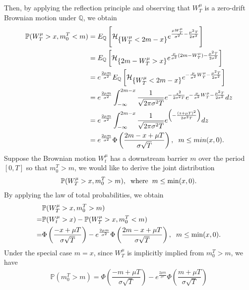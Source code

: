 Then, by applying the reflection principle and observing
that $W^\mu_T$ is a zero-drift Brownian motion under 
$\mathbb{Q}$, we obtain
\begin{align*}
	\mathbb{P}(W^\mu_T>x, m^T_0<m)&=E_\mathbb{Q}\left[\mathcal{H}_{\displaystyle \{W^\mu_T<2m-x\}}e^{\frac{\mu W^\mu_T }{\sigma^2}-\frac{\mu^2 T}{2\sigma^2}}\right]\\
	&=E_\mathbb{Q}\left[\mathcal{H}_{\displaystyle \{2m-W^\mu_T>x\}}e^{\frac{\mu }{\sigma^2}(2m-W^\mu_T)-\frac{\mu^2 T}{2\sigma^2}}\right]\\
	&=e^{\frac{2\mu m}{\sigma^2}}E_\mathbb{Q}\left[\mathcal{H}_{\displaystyle \{W^\mu_T<2m-x\}}e^{-\frac{\mu }{\sigma^2}W^\mu_T-\frac{\mu^2 T}{2\sigma^2}}\right]\\
	&=e^{\frac{2\mu m}{\sigma^2}}\displaystyle \int_{-\infty}^{2m-x}\dfrac{1}{\sqrt{2\pi\sigma^2 T}}e^{-\frac{z^2}{2\sigma^2 T}}e^{-\frac{\mu }{\sigma^2}W^\mu_T-\frac{\mu^2 T}{2\sigma^2}}dz\\
	&=e^{\frac{2\mu m}{\sigma^2}}\displaystyle \int_{-\infty}^{2m-x}\dfrac{1}{\sqrt{2\pi\sigma^2 T}}e^{\left(-\frac{(z+\mu T)^2}{2\sigma^2 T}\right)}dz\\
	&=e^{\frac{2\mu m}{\sigma^2}}\Phi\left(\dfrac{2m-x+\mu T}{\sigma\sqrt{T}}\right), \hspace{0.2cm} m\leq min(x, 0).
\end{align*}
Suppose the Brownian motion $W^\mu_t$ has a downstream barrier $m$ over the period
$[0, T ]$ so that $m^T_0
> m$, we would like to derive the joint distribution
\begin{align*}
		\mathbb{P}(W^\mu_T>x, m^T_0>m), \hspace{0.2cm} \textnormal{where} \hspace{0.2cm} m\leq \min(x, 0).
\end{align*}
By applying the law of total probabilities, we obtain
\begin{align*}
	&\mathbb{P}(W^\mu_T>x, m^T_0>m)\\
	=&\mathbb{P}(W^\mu_t>x)-\mathbb{P}(W^\mu_T>x, m^T_0<m)\\
	=&\Phi\left(\dfrac{-x+\mu T}{\sigma\sqrt{T}}\right)-e^{\frac{2\mu m}{\sigma^2}}\Phi\left(\dfrac{2m-x+\mu T}{\sigma\sqrt{T}}\right), \hspace{0.2cm} m\leq \min(x, 0).
\end{align*}
Under the special case $m = x$, since $W^\mu_T$ is implicitly implied from $m^T_0>m$,
we have
\begin{align}
	\mathbb{P}(m^T_0>m)=\Phi\left(\dfrac{-m+\mu T}{\sigma\sqrt{T}}\right)-e^{\frac{2\mu m}{\sigma^2}}\Phi\left(\dfrac{m+\mu T}{\sigma\sqrt{T}}\right)\label{eq421}
\end{align}
